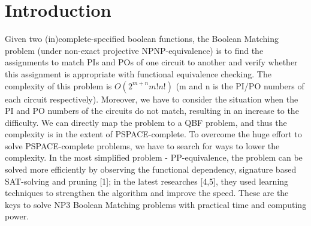 \section{Introduction}
Given two (in)complete-specified boolean functions, the Boolean Matching problem (under non-exact projective NPNP-equivalence) is to find the assignments to match PIs and POs of one circuit to another and verify whether this assignment is appropriate with functional equivalence checking. The complexity of this problem is $O(2^{m+n}m!n!)$ (m and n is the PI/PO numbers of each circuit respectively). Moreover, we have to consider the situation when the PI and PO numbers of the circuits do not match, resulting in an increase to the difficulty. We can directly map the problem to a QBF problem, and thus the complexity is in the extent of PSPACE-complete. To overcome the huge effort to solve PSPACE-complete problems, we have to search for ways to lower the complexity. In the most simplified problem - PP-equivalence, the problem can be solved more efficiently by observing the functional dependency, signature based SAT-solving and pruning [1]; in the latest researches [4,5], they used learning techniques to strengthen the algorithm and improve the speed. These are the keys to solve NP3 Boolean Matching problems with practical time and computing power.


%
%

